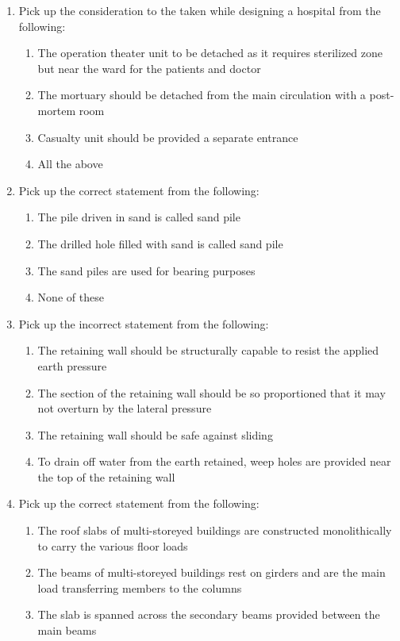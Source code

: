\documentclass[11pt,a4paper]{article}
\begin{document}
\begin{enumerate}
\begin{enumerate}[label=\Alph*.]
\end{enumerate}
\item{Pick up the consideration to the taken while designing a hospital from the following:}
\begin{enumerate}[label=\Alph*.]
\item{The operation theater unit to be detached as it requires sterilized zone but near the ward for the patients and doctor}
\item{The mortuary should be detached from the main circulation with a post-mortem room}
\item{Casualty unit should be provided a separate entrance}
\item{All the above}
\end{enumerate}
\item{Pick up the correct statement from the following:}
\begin{enumerate}[label=\Alph*.]
\item{The pile driven in sand is called sand pile}
\item{The drilled hole filled with sand is called sand pile}
\item{The sand piles are used for bearing purposes}
\item{None of these}
\end{enumerate}
\item{Pick up the incorrect statement from the following:}
\begin{enumerate}[label=\Alph*.]
\item{The retaining wall should be structurally capable to resist the applied earth pressure}
\item{The section of the retaining wall should be so proportioned that it may not overturn by the lateral pressure}
\item{The retaining wall should be safe against sliding}
\item{To drain off water from the earth retained, weep holes are provided near the top of the retaining wall}
\end{enumerate}
\item{Pick up the correct statement from the following:}
\begin{enumerate}[label=\Alph*.]
\item{The roof slabs of multi-storeyed buildings are constructed monolithically to carry the various floor loads}
\item{The beams of multi-storeyed buildings rest on girders and are the main load transferring members to the columns}
\item{The slab is spanned across the secondary beams provided between the main beams}

\end{enumerate}
\end{enumerate}
\end{document}
